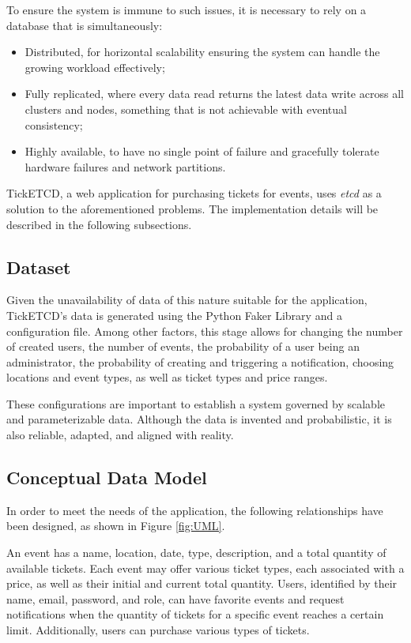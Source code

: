 \documentclass[screen,review]{acmart}
\begin{document}
To ensure the system is immune to such issues, it is necessary to rely on a database that is simultaneously:

\begin{itemize}
    \item Distributed, for horizontal scalability ensuring the system can handle the growing workload effectively;
    \item Fully replicated, where every data read returns the latest data write across all clusters and nodes, something that is not achievable with eventual consistency;
    \item Highly available, to have no single point of failure and gracefully tolerate hardware failures and network partitions.
\end{itemize}

TickETCD, a web application for purchasing tickets for events, uses \textit{etcd} as a solution to the aforementioned problems. The implementation details will be described in the following subsections.

\subsection{Dataset}
Given the unavailability of data of this nature suitable for the application, TickETCD's data is generated using the Python Faker Library \cite{faker} and a configuration file. Among other factors, this stage allows for changing the number of created users, the number of events, the probability of a user being an administrator, the probability of creating and triggering a notification, choosing locations and event types, as well as ticket types and price ranges.

These configurations are important to establish a system governed by scalable and parameterizable data. Although the data is invented and probabilistic, it is also reliable, adapted, and aligned with reality.

\subsection{Conceptual Data Model}
In order to meet the needs of the application, the following relationships have been designed, as shown in Figure \ref{fig:UML}.

An event has a name, location, date, type, description, and a total quantity of available tickets. Each event may offer various ticket types, each associated with a price, as well as their initial and current total quantity. Users, identified by their name, email, password, and role, can have favorite events and request notifications when the quantity of tickets for a specific event reaches a certain limit. Additionally, users can purchase various types of tickets.
\end{document}
